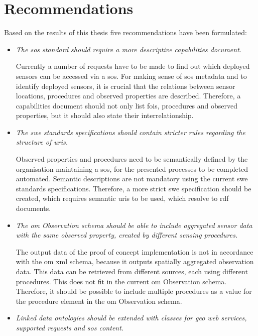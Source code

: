 \section{Recommendations}

Based on the results of this thesis five recommendations have been formulated: 

\begin{itemize}
	\item \textit{The \ac{sos} standard should require a more descriptive capabilities document.}
	
	Currently a number of requests have to be made to find out which deployed sensors can be accessed via a \ac{sos}. For making sense of \ac{sos} metadata and to identify deployed sensors, it is crucial that the relations between sensor locations, procedures and observed properties are described. Therefore, a capabilities document should not only list \acp{foi}, procedures and observed properties, but it should also state their interrelationship.    
	
	
	\item \textit{The \ac{swe} standards specifications should contain stricter rules regarding the structure of \acp{uri}.}
	
	Observed properties and procedures need to be semantically defined by the organisation maintaining a \ac{sos}, for the presented processes to be completed automated. Semantic descriptions are not mandatory using the current \ac{swe} standards specifications. Therefore, a more strict \ac{swe} specification should be created, which requires semantic \acp{uri} to be used, which resolve to \ac{rdf} documents. 
	
	
	\item \textit{The \ac{om} Observation schema should be able to include aggregated sensor data with the same observed property, created by different sensing procedures.}
	
	The output data of the proof of concept implementation is not in accordance with the \ac{om} \ac{xml} schema, because it outputs spatially aggregated observation data. This data can be retrieved from different sources, each using different procedures. This does not fit in the current \ac{om} Observation schema. Therefore, it should be possible to include multiple procedures as a value for the procedure element in the \ac{om} Observation schema.   

	
	\item \textit{Linked data ontologies should be extended with classes for geo web services, supported requests and \ac{sos} content.}
	

\end{itemize}
